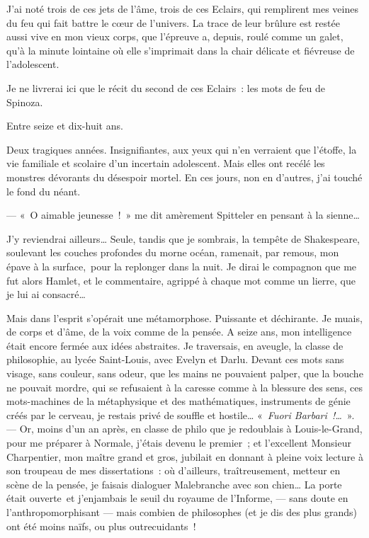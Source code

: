 J'ai noté trois de ces jets de l'âme, trois de ces Eclairs, qui
remplirent mes veines du feu qui fait battre le c\oe ur de l'univers. La
trace de leur brûlure est restée aussi vive en mon vieux corps, que
l'épreuve a, depuis, roulé comme un galet, qu'à la minute lointaine où
elle s'imprimait dans la chair délicate et fiévreuse de l'adolescent.

Je ne livrerai ici que le récit du second de ces Eclairs~: les mots de
feu de Spinoza.

Entre seize et dix-huit ans.

Deux tragiques années. Insignifiantes, aux yeux qui n'en verraient que
l'étoffe, la vie familiale et scolaire d'un incertain adolescent. Mais
elles ont recélé les monstres dévorants du désespoir mortel. En ces
jours, non en d'autres, j'ai touché le fond du néant.

--- «~O aimable jeunesse~!~» me dit amèrement Spitteler en pensant à la
sienne\ldots{}

J'y reviendrai ailleurs\ldots{} Seule, tandis que je sombrais, la tempête de
Shakespeare, soulevant les couches profondes du morne océan, ramenait,
par remous, mon épave à la surface,\est\ pour la replonger dans la nuit. Je
dirai le compagnon que me fut alors Hamlet, et le commentaire, agrippé à
chaque mot comme un lierre, que je lui ai consacré\ldots{}

Mais dans l'esprit s'opérait une métamorphose. Puissante et déchirante.
Je muais, de corps et d'âme, de la voix comme de la pensée. A seize ans,
mon intelligence était encore fermée aux idées abstraites. Je
traversais, en aveugle, la classe de philosophie, au lycée Saint-Louis,
avec Evelyn et Darlu. Devant ces mots sans visage, sans couleur, sans
odeur, que les mains ne pouvaient palper, que la bouche ne pouvait
mordre, qui se refusaient à la caresse comme à la blessure des sens, ces
mots-machines de la métaphysique et des mathématiques, instruments de
génie créés par le cerveau, je restais privé de souffle et hostile\ldots{}
«~\emph{Fuori Barbari~!\ldots{}}~». --- Or, moins d'un an après, en classe de
philo que je redoublais à Louis-le-Grand, pour me préparer à Normale,
j'étais devenu le premier~; et l'excellent Monsieur Charpentier, mon
maître grand et gros, jubilait en donnant à pleine voix lecture à son
troupeau de mes dissertations~: où d'ailleurs, traîtreusement, metteur
en scène de la pensée, je faisais dialoguer Malebranche avec son
chien\ldots{} La porte était ouverte\est\ et j'enjambais le seuil du royaume de
l'Informe, --- sans doute en l'anthropomorphisant --- mais combien de
philosophes (et je dis des plus grands) ont été moins naïfs, ou plus
outrecuidants~!

